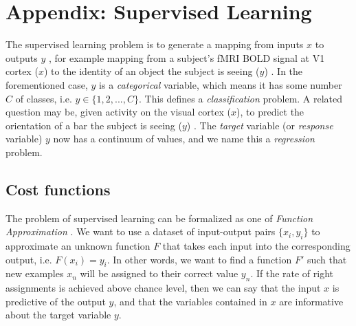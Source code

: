 \chapter*{Appendix: Supervised Learning}
\label{app:ml}

The supervised learning problem is to generate a mapping from inputs $x$ to outputs $y$ \cite{murphy2012machine}, for example mapping from a subject's fMRI BOLD signal at V1 cortex ($x$) to the identity of an object the subject is seeing ($y$) \cite{dubois2015single}. In the forementioned case, $y$ is a \textit{categorical} variable, which means it has some number $C$ of classes, i.e. $y \in \{1,2,...,C\}$. This defines a \textit{classification} problem. 
A related question may be, given activity on the visual cortex ($x$), to predict the orientation of a bar the subject is seeing ($y$) \cite{carlson2014orientation}. The \textit{target} variable (or \textit{response} variable) $y$ now has a continuum of values, and we name this a \textit{regression} problem.

\section*{Cost functions}
    The problem of supervised learning can be formalized as one of \textit{Function Approximation} \cite{murphy2012machine}. We want to use a dataset of input-output pairs $\{x_i, y_i\}$ to approximate an unknown function $F$ that takes each input into the corresponding output, i.e. $F(x_i) = y_i$. In other words, we want to find a function $F'$ such that new examples $x_n$ will be assigned to their correct value $y_n$. If the rate of right assignments is achieved above chance level, then we can say that the input $x$ is predictive of the output $y$, and that the variables contained in $x$ are informative about the target variable $y$. 
    
